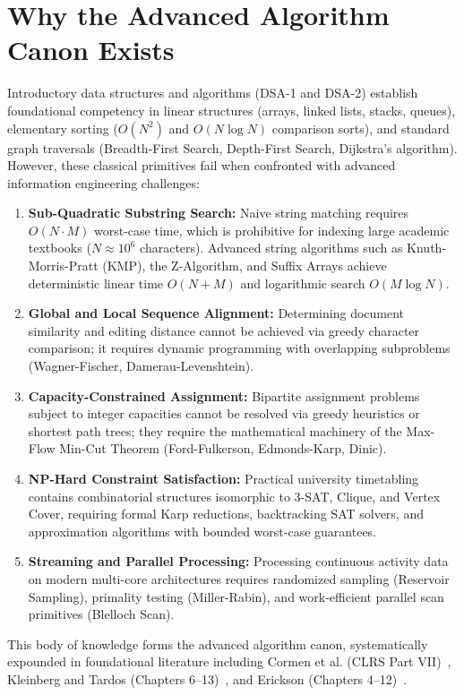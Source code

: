 \section{Why the Advanced Algorithm Canon Exists}
Introductory data structures and algorithms (DSA-1 and DSA-2) establish foundational competency in linear structures (arrays, linked lists, stacks, queues), elementary sorting ($O(N^2)$ and $O(N \log N)$ comparison sorts), and standard graph traversals (Breadth-First Search, Depth-First Search, Dijkstra's algorithm). However, these classical primitives fail when confronted with advanced information engineering challenges:
\begin{enumerate}
    \item \textbf{Sub-Quadratic Substring Search:} Naive string matching requires $O(N \cdot M)$ worst-case time, which is prohibitive for indexing large academic textbooks ($N \approx 10^6$ characters). Advanced string algorithms such as Knuth-Morris-Pratt (KMP), the Z-Algorithm, and Suffix Arrays achieve deterministic linear time $O(N + M)$ and logarithmic search $O(M \log N)$.
    \item \textbf{Global and Local Sequence Alignment:} Determining document similarity and editing distance cannot be achieved via greedy character comparison; it requires dynamic programming with overlapping subproblems (Wagner-Fischer, Damerau-Levenshtein).
    \item \textbf{Capacity-Constrained Assignment:} Bipartite assignment problems subject to integer capacities cannot be resolved via greedy heuristics or shortest path trees; they require the mathematical machinery of the Max-Flow Min-Cut Theorem (Ford-Fulkerson, Edmonds-Karp, Dinic).
    \item \textbf{NP-Hard Constraint Satisfaction:} Practical university timetabling contains combinatorial structures isomorphic to 3-SAT, Clique, and Vertex Cover, requiring formal Karp reductions, backtracking SAT solvers, and approximation algorithms with bounded worst-case guarantees.
    \item \textbf{Streaming and Parallel Processing:} Processing continuous activity data on modern multi-core architectures requires randomized sampling (Reservoir Sampling), primality testing (Miller-Rabin), and work-efficient parallel scan primitives (Blelloch Scan).
\end{enumerate}

This body of knowledge forms the advanced algorithm canon, systematically expounded in foundational literature including Cormen et al. (CLRS Part VII)~\cite{clrs2009}, Kleinberg and Tardos (Chapters 6--13)~\cite{kleinberg2006}, and Erickson (Chapters 4--12)~\cite{erickson2019}.

